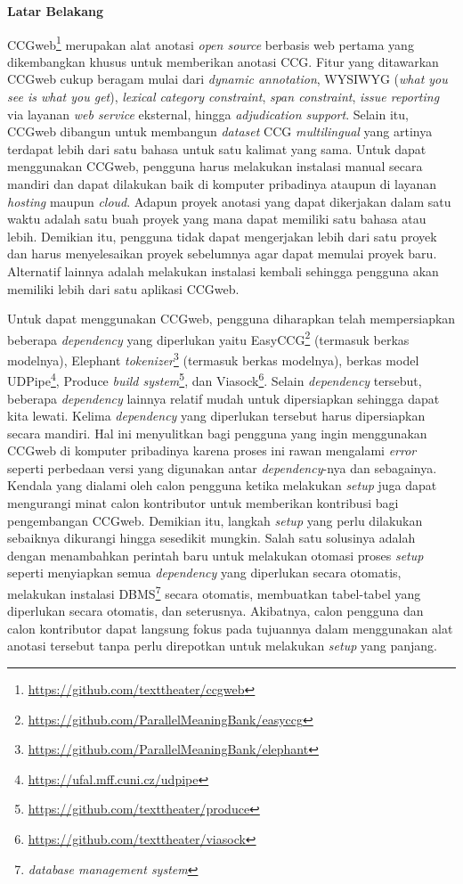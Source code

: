 \noindent\textbf{Latar Belakang}

CCGweb\footnote{\url{https://github.com/texttheater/ccgweb}} merupakan alat anotasi
\textit{open source} berbasis web pertama yang dikembangkan khusus untuk memberikan anotasi
CCG\citep{evang-etal-2019-ccgweb}. Fitur yang ditawarkan CCGweb cukup beragam mulai dari
\textit{dynamic annotation}, WYSIWYG (\textit{what you see is what you get}),
\textit{lexical category constraint}, \textit{span constraint}, \textit{issue reporting} via
layanan \textit{web service} eksternal, hingga \textit{adjudication support}. Selain itu, CCGweb
dibangun untuk membangun \textit{dataset} CCG \textit{multilingual} yang artinya terdapat lebih
dari satu bahasa untuk satu kalimat yang sama. Untuk dapat menggunakan CCGweb, pengguna harus
melakukan instalasi manual secara mandiri dan dapat dilakukan baik di komputer pribadinya ataupun
di layanan \textit{hosting} maupun \textit{cloud}. Adapun proyek anotasi yang dapat dikerjakan
dalam satu waktu adalah satu buah proyek yang mana dapat memiliki satu bahasa atau lebih.
Demikian itu, pengguna tidak dapat mengerjakan lebih dari satu proyek dan harus menyelesaikan
proyek sebelumnya agar dapat memulai proyek baru. Alternatif lainnya adalah melakukan instalasi
kembali sehingga pengguna akan memiliki lebih dari satu aplikasi CCGweb.

Untuk dapat menggunakan CCGweb, pengguna diharapkan telah mempersiapkan beberapa
\textit{dependency} yang diperlukan yaitu
EasyCCG\footnote{\url{https://github.com/ParallelMeaningBank/easyccg}} (termasuk berkas modelnya),
Elephant \textit{tokenizer}\footnote{\url{https://github.com/ParallelMeaningBank/elephant}}
(termasuk berkas modelnya), berkas model UDPipe\footnote{\url{https://ufal.mff.cuni.cz/udpipe}},
Produce \textit{build system}\footnote{\url{https://github.com/texttheater/produce}}, dan
Viasock\footnote{\url{https://github.com/texttheater/viasock}}. Selain \textit{dependency} tersebut,
beberapa \textit{dependency} lainnya relatif mudah untuk dipersiapkan sehingga dapat kita lewati.
Kelima \textit{dependency} yang diperlukan tersebut harus dipersiapkan secara mandiri. Hal ini
menyulitkan bagi pengguna yang ingin menggunakan CCGweb di komputer pribadinya karena proses ini
rawan mengalami \textit{error} seperti perbedaan versi yang digunakan antar \textit{dependency}-nya
dan sebagainya. Kendala yang dialami oleh calon pengguna ketika melakukan \textit{setup} juga dapat
mengurangi minat calon kontributor untuk memberikan kontribusi bagi pengembangan CCGweb. Demikian
itu, langkah \textit{setup} yang perlu dilakukan sebaiknya dikurangi hingga sesedikit mungkin.
Salah satu solusinya adalah dengan menambahkan perintah baru untuk melakukan otomasi proses
\textit{setup} seperti menyiapkan semua \textit{dependency} yang diperlukan secara otomatis,
melakukan instalasi DBMS\footnote{\textit{database management system}} secara otomatis, membuatkan
tabel-tabel yang diperlukan secara otomatis, dan seterusnya. Akibatnya, calon pengguna dan calon
kontributor dapat langsung fokus pada tujuannya dalam menggunakan alat anotasi tersebut tanpa perlu
direpotkan untuk melakukan \textit{setup} yang panjang.

